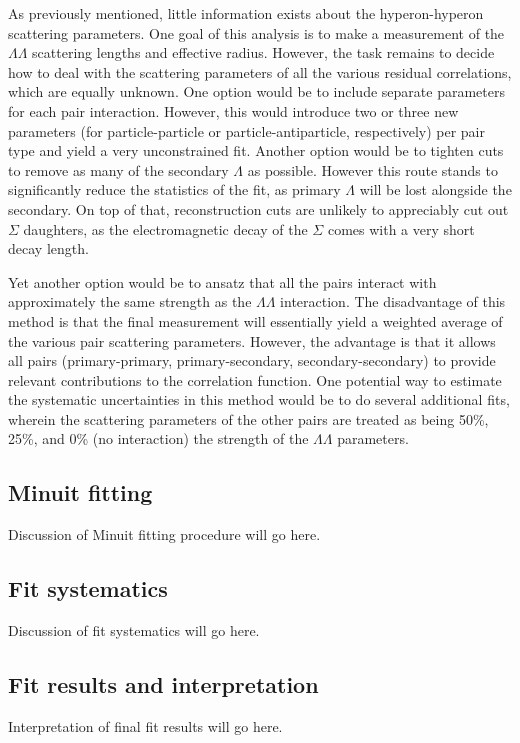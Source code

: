 As previously mentioned, little information exists about the hyperon-hyperon scattering parameters.  
One goal of this analysis is to make a measurement of the $\Lambda\Lambda$ scattering lengths and effective radius.  
However, the task remains to decide how to deal with the scattering parameters of all the various residual correlations, which are equally unknown.  
One option would be to include separate parameters for each pair interaction.  
However, this would introduce two or three new parameters (for particle-particle or particle-antiparticle, respectively) per pair type and yield a very unconstrained fit.  
Another option would be to tighten cuts to remove as many of the secondary $\Lambda$ as possible.  However this route stands to significantly reduce the statistics of the fit, as primary $\Lambda$ will be lost alongside the secondary.  
On top of that, reconstruction cuts are unlikely to appreciably cut out $\Sigma$ daughters, as the electromagnetic decay of the $\Sigma$ comes with a very short decay length.

Yet another option would be to ansatz that all the pairs interact with approximately the same strength as the $\Lambda\Lambda$ interaction.  
The disadvantage of this method is that the final measurement will essentially yield a weighted average of the various pair scattering parameters.  
However, the advantage is that it allows all pairs (primary-primary, primary-secondary, secondary-secondary) to provide relevant contributions to the correlation function.  
One potential way to estimate the systematic uncertainties in this method would be to do several additional fits, wherein the scattering parameters of the other pairs are treated as being 50\%, 25\%, and 0\% (no interaction) the strength of the $\Lambda\Lambda$ parameters.

\subsection{Minuit fitting}
\label{sec:MinuitFit}

Discussion of Minuit fitting procedure will go here.

\subsection{Fit systematics}
\label{sec:FitSystematics}

Discussion of fit systematics will go here.

\subsection{Fit results and interpretation}
\label{sec:FitResults}

Interpretation of final fit results will go here.


